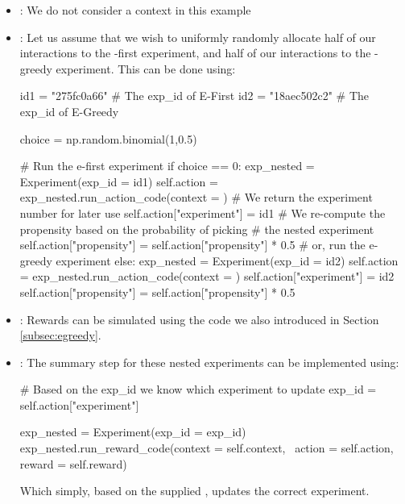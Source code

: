 \documentclass[nojss]{jss}
\begin{document}
\begin{itemize}
\item {}: We do not consider a context in this example
\item {}: Let us assume that we wish to uniformly randomly allocate half of our interactions to the -first experiment, and half of our interactions to the -greedy experiment. This can be done using:
\begin{Code}
id1 = "275fc0a66" # The exp_id of E-First
id2 = "18aec502c2" # The exp_id of E-Greedy

choice = np.random.binomial(1,0.5)

# Run the e-first experiment
if choice == 0:
    exp_nested = Experiment(exp_id = id1)
    self.action = exp_nested.run_action_code(context = {})
    # We return the experiment number for later use
    self.action["experiment"] = id1
    # We re-compute the propensity based on the probability of picking
    # the nested experiment
    self.action["propensity"] = self.action["propensity"] * 0.5
# or, run the e-greedy experiment
else: 
    exp_nested = Experiment(exp_id = id2)
    self.action = exp_nested.run_action_code(context = {})
    self.action["experiment"] = id2
    self.action["propensity"] = self.action["propensity"] * 0.5
\end{Code}

\item {}: Rewards can be simulated using the code we also introduced in Section \ref{subsec:egreedy}.

\item {}: The summary step for these nested experiments can be implemented using:
\begin{Code}
# Based on the exp_id we know which experiment to update
exp_id = self.action["experiment"]

exp_nested = Experiment(exp_id = exp_id)
exp_nested.run_reward_code(context = self.context, \
  action = self.action, reward = self.reward)
\end{Code}
Which simply, based on the supplied , updates the correct experiment.
\end{itemize}
\end{document}
